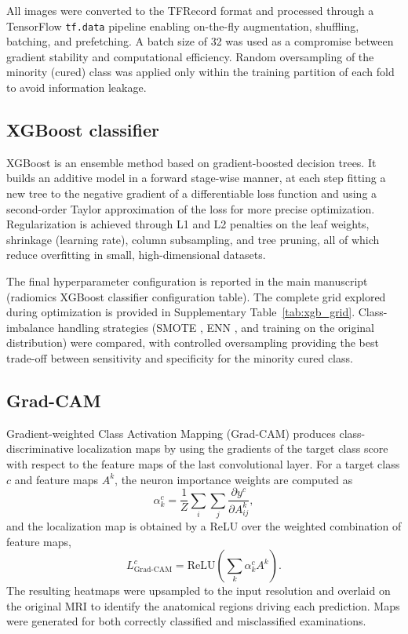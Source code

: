 \documentclass[fleqn,10pt]{wlscirep}
\begin{document}
All images were converted to the TFRecord format and processed through a TensorFlow \texttt{tf.data} pipeline enabling on-the-fly augmentation, shuffling, batching, and prefetching. A batch size of 32 was used as a compromise between gradient stability and computational efficiency. Random oversampling of the minority (cured) class was applied only within the training partition of each fold to avoid information leakage.

\subsection*{XGBoost classifier}

XGBoost \cite{Chen2016} is an ensemble method based on gradient-boosted decision trees. It builds an additive model in a forward stage-wise manner, at each step fitting a new tree to the negative gradient of a differentiable loss function and using a second-order Taylor approximation of the loss for more precise optimization. Regularization is achieved through L1 and L2 penalties on the leaf weights, shrinkage (learning rate), column subsampling, and tree pruning, all of which reduce overfitting in small, high-dimensional datasets.

The final hyperparameter configuration is reported in the main manuscript (radiomics XGBoost classifier configuration table). The complete grid explored during optimization is provided in Supplementary Table~\ref{tab:xgb_grid}. Class-imbalance handling strategies (SMOTE \cite{Chawla2002}, ENN \cite{Wilson1972}, and training on the original distribution) were compared, with controlled oversampling providing the best trade-off between sensitivity and specificity for the minority cured class.

\subsection*{Grad-CAM}

Gradient-weighted Class Activation Mapping (Grad-CAM) \cite{selvaraju2017gradcam} produces class-discriminative localization maps by using the gradients of the target class score with respect to the feature maps of the last convolutional layer. For a target class $c$ and feature maps $A^k$, the neuron importance weights are computed as
\begin{equation}
\alpha_k^{c} = \frac{1}{Z}\sum_{i}\sum_{j}\frac{\partial y^{c}}{\partial A^{k}_{ij}},
\end{equation}
and the localization map is obtained by a ReLU over the weighted combination of feature maps,
\begin{equation}
L^{c}_{\text{Grad-CAM}} = \text{ReLU}\!\left(\sum_{k}\alpha_k^{c} A^{k}\right).
\end{equation}
The resulting heatmaps were upsampled to the input resolution and overlaid on the original MRI to identify the anatomical regions driving each prediction. Maps were generated for both correctly classified and misclassified examinations.
\end{document}
